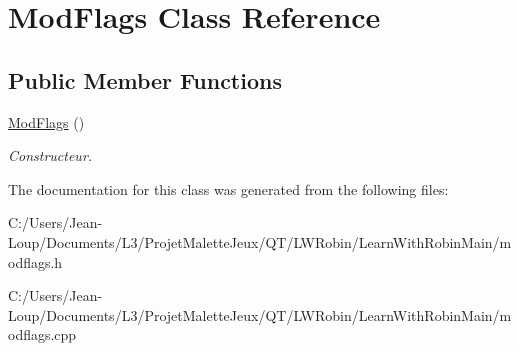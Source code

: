 \hypertarget{class_mod_flags}{}\section{Mod\+Flags Class Reference}
\label{class_mod_flags}
\subsection*{Public Member Functions}
\begin{DoxyCompactItemize}
\item 
\mbox{\label{class_mod_flags_a5d6e32a267ab2ef7bc4b63522b0db027}} 
\hyperlink{class_mod_flags_a5d6e32a267ab2ef7bc4b63522b0db027}{Mod\+Flags} ()
\begin{DoxyCompactList}\small\item\em Constructeur. \end{DoxyCompactList}\end{DoxyCompactItemize}


The documentation for this class was generated from the following files\+:\begin{DoxyCompactItemize}
\item 
C\+:/\+Users/\+Jean-\/\+Loup/\+Documents/\+L3/\+Projet\+Malette\+Jeux/\+Q\+T/\+L\+W\+Robin/\+Learn\+With\+Robin\+Main/modflags.\+h\item 
C\+:/\+Users/\+Jean-\/\+Loup/\+Documents/\+L3/\+Projet\+Malette\+Jeux/\+Q\+T/\+L\+W\+Robin/\+Learn\+With\+Robin\+Main/modflags.\+cpp\end{DoxyCompactItemize}
